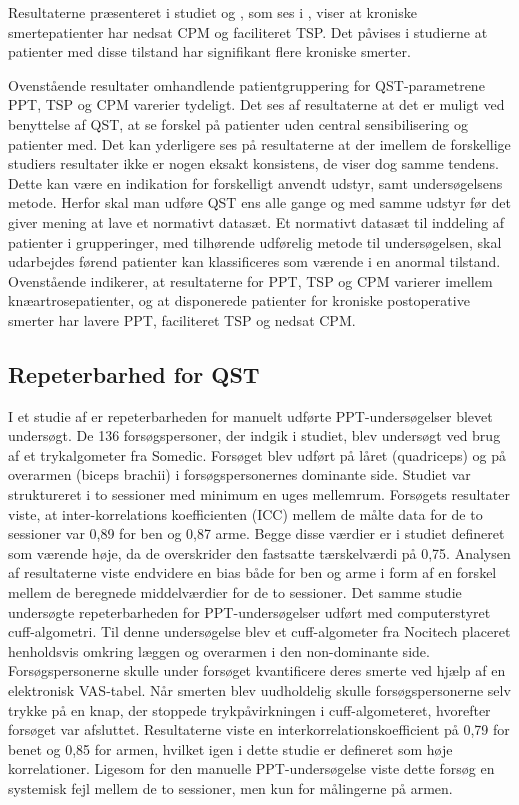 Resultaterne præsenteret i studiet  og , som ses i , viser at kroniske smertepatienter har nedsat CPM og faciliteret TSP. Det påvises i studierne at patienter med disse tilstand har signifikant flere kroniske smerter. \citep{Veagter2016} \citep{Petersen2016}

Ovenstående resultater omhandlende patientgruppering for QST-parametrene PPT, TSP og CPM varerier tydeligt. Det ses af resultaterne at det er muligt ved benyttelse af QST, at se forskel på patienter uden central sensibilisering og patienter med. Det kan yderligere ses på resultaterne at der imellem de forskellige studiers resultater ikke er nogen eksakt konsistens, de viser dog samme tendens. Dette kan være en indikation for forskelligt anvendt udstyr, samt undersøgelsens metode. Herfor skal man udføre QST ens alle gange og med samme udstyr før det giver mening at lave et normativt datasæt. Et normativt datasæt til inddeling af patienter i grupperinger, med tilhørende udførelig metode til undersøgelsen, skal udarbejdes førend patienter kan klassificeres som værende i en anormal tilstand.  Ovenstående indikerer, at resultaterne for PPT, TSP og CPM varierer imellem knæartrosepatienter, og at disponerede patienter for kroniske postoperative smerter har lavere PPT, faciliteret TSP og nedsat CPM. 

\subsection{Repeterbarhed for QST}
I et studie af  er repeterbarheden for manuelt udførte PPT-undersøgelser blevet undersøgt. De 136 forsøgspersoner, der indgik i studiet, blev undersøgt ved brug af et trykalgometer fra Somedic. Forsøget blev udført på låret (quadriceps) og på overarmen (biceps brachii) i forsøgspersonernes dominante side. Studiet var struktureret i to sessioner med minimum en uges mellemrum. Forsøgets resultater viste, at inter-korrelations koefficienten (ICC) mellem de målte data for de to sessioner var 0,89 for ben og 0,87 arme. Begge disse værdier er i studiet defineret som værende høje, da de overskrider den fastsatte tærskelværdi på 0,75. Analysen af resultaterne viste endvidere en bias både for ben og arme i form af en forskel mellem de beregnede middelværdier for de to sessioner. Det samme studie undersøgte repeterbarheden for PPT-undersøgelser udført med computerstyret cuff-algometri. Til denne undersøgelse blev et cuff-algometer fra Nocitech placeret henholdsvis omkring læggen og overarmen i den non-dominante side. Forsøgspersonerne skulle under forsøget kvantificere deres smerte ved hjælp af en elektronisk VAS-tabel. Når smerten blev uudholdelig skulle forsøgspersonerne selv trykke på en knap, der stoppede trykpåvirkningen i cuff-algometeret, hvorefter forsøget var afsluttet. Resultaterne viste en interkorrelationskoefficient på 0,79 for benet og 0,85 for armen, hvilket igen i dette studie er defineret som høje korrelationer. Ligesom for den manuelle PPT-undersøgelse viste dette forsøg en systemisk fejl mellem de to sessioner, men kun for målingerne på armen.

